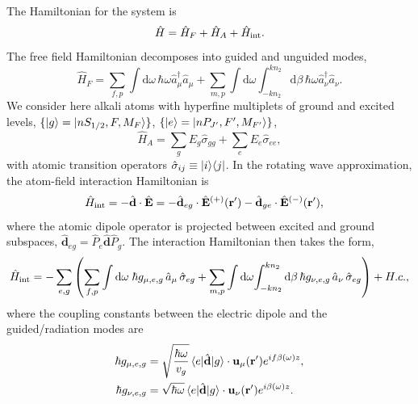 \documentclass[preprint,aps,pra,onecolumn]{revtex4-1} %
\newcommand{\inter}{{\rm int}}
\begin{document}
The Hamiltonian for the system is
\begin{equation}
\hat{H} = \hat{H}_F+\hat{H}_A + \hat{H}_{\inter}.
\end{equation}
The free field Hamiltonian decomposes into guided and unguided modes, 
	\begin{equation}
		\hat{H}_F = \sum_{f,p}\int \mathrm{d}\omega \, \hbar \omega \hat{a}^\dagger_\mu \hat{a}_\mu 
+\sum_{m,p} \int \mathrm{d}\omega  \int_{-k n_2}^{k n_2} \mathrm{d}\beta \, \hbar \omega 
\hat{a}^\dagger_\nu \hat{a}_\nu.
	\end{equation}
We consider here alkali atoms with hyperfine multiplets of ground and excited levels, $\{ 
\lvert{g}\rangle=\lvert{nS_{1/2}, F, M_F}\rangle\}$, $\{ \lvert{e}\rangle =\lvert{nP_{J'}, F', M_{F'}}\rangle\}$,
	\begin{equation}
		\hat{H}_A  = \sum_g E_g \hat{\sigma}_{gg} + \sum_e E_e \hat{\sigma}_{ee},
	\end{equation}
with atomic transition operators $\hat{\sigma}_{ij} \equiv \lvert{i}\rangle\langle{j}\rvert$.  In the rotating wave approximation, the atom-field interaction Hamiltonian is
	\begin{align}
		\hat{H}_{\inter} &= -\hat{\mathbf{d}}\cdot \hat{\mathbf{E}} = -\hat{\mathbf{d}}_{eg}\cdot 
\hat{\mathbf{E}}^{(+)}(\br')-\hat{\mathbf{d}}_{ge}\cdot \hat{\mathbf{E}}^{(-)}(\br'),
	\end{align}
where the atomic dipole operator is projected between excited and ground subspaces, $\hat{\mathbf{d}}_{eg}= \hat{P}_e \hat{\mathbf{d}} \hat{P}_g $. The interaction Hamiltonian then takes the form, 
\begin{equation}
	\hat{H}_{\inter} = -\sum_{e,g} \left(\sum_{f,p} \int\mathrm{d}\omega \; \hbar g_{\mu, e,g}\, \hat{a}_\mu  \, 
		\hat{\sigma}_{eg}+ \sum_{m,p} \int\mathrm{d}\omega \! \int_{-kn_2}^{kn_2}\mathrm{d}\beta \,  \hbar 
g_{\nu, e,g}\, \hat{a}_\nu \, \hat{\sigma}_{eg}\right) + {H.c.},
	\end{equation}
where the coupling constants between the electric dipole and the guided/radiation modes are
\begin{subequations} \label{Eq::CouplingConstants}
	\begin{align}
		\hbar g_{\mu, e,g} &= \sqrt{\frac{\hbar \omega}{ v_g  }}\, \langle{e}\rvert \hat{\mathbf{d}} \lvert{g}\rangle 
\cdot\mathbf{u}_\mu (\mathbf{r}') e^{i f \beta(\omega)z} , \\
		\hbar g_{\nu, e,g} &= \sqrt{  \hbar \omega } \, \langle{e}\rvert \hat{\mathbf{d}} \lvert{g}\rangle \cdot \mathbf{u}_\nu (\mathbf{r}') e^{i\beta(\omega)z}  .
\end{align}
	\end{subequations}
\end{document}
